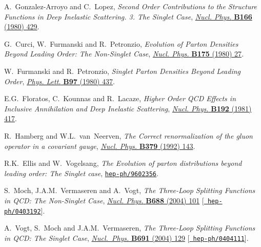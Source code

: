 \documentclass[12pt]{article}
\begin{document}
{\begin{thebibliography}{100}
A.~Gonzalez-Arroyo and C.~Lopez, \emph{{Second Order Contributions to the
  Structure Functions in Deep Inelastic Scattering. 3. The Singlet Case}},
  \href{https://dx.doi.org/10.1016/0550-3213(80)90207-2}{\emph{Nucl. Phys.}
  {\bf B166} (1980) 429}.

G.~Curci, W.~Furmanski and R.~Petronzio, \emph{{Evolution of Parton Densities
  Beyond Leading Order: The Non-Singlet Case}},
  \href{https://dx.doi.org/10.1016/0550-3213(80)90003-6}{\emph{Nucl. Phys.}
  {\bf B175} (1980) 27}.

W.~Furmanski and R.~Petronzio, \emph{{Singlet Parton Densities Beyond Leading
  Order}}, \href{https://dx.doi.org/10.1016/0370-2693(80)90636-X}{\emph{Phys.
  Lett.} {\bf B97} (1980) 437}.

E.G.~Floratos, C.~Kounnas and R.~Lacaze, \emph{{Higher Order QCD Effects in
  Inclusive Annihilation and Deep Inelastic Scattering}},
  \href{https://dx.doi.org/10.1016/0550-3213(81)90434-X}{\emph{Nucl. Phys.}
  {\bf B192} (1981) 417}.

R.~Hamberg and W.L.~van~Neerven, \emph{{The Correct renormalization of the
  gluon operator in a covariant gauge}},
  \href{https://dx.doi.org/10.1016/0550-3213(92)90593-Z}{\emph{Nucl. Phys.}
  {\bf B379} (1992) 143}.

R.K.~Ellis and W.~Vogelsang, \emph{{The Evolution of parton distributions
  beyond leading order: The Singlet case}},
  \href{https://arxiv.org/abs/hep-ph/9602356}{{\tt hep-ph/9602356}}.

S.~Moch, J.A.M.~Vermaseren and A.~Vogt, \emph{{The Three-Loop Splitting
  Functions in QCD: The Non-Singlet Case}},
  \href{https://dx.doi.org/10.1016/j.nuclphysb.2004.03.030}{\emph{Nucl. Phys.}
  {\bf B688} (2004) 101} [\href{https://arxiv.org/abs/hep-ph/0403192}{{\tt
  hep-ph/0403192}}].

A.~Vogt, S.~Moch and J.A.M.~Vermaseren, \emph{{The Three-Loop Splitting
  Functions in QCD: The Singlet Case}},
  \href{https://dx.doi.org/10.1016/j.nuclphysb.2004.04.024}{\emph{Nucl.~Phys.}
  {\bf B691} (2004) 129} [\href{https://arxiv.org/abs/hep-ph/0404111}{{\tt
  hep-ph/0404111}}].


\end{thebibliography}}
\end{document}
